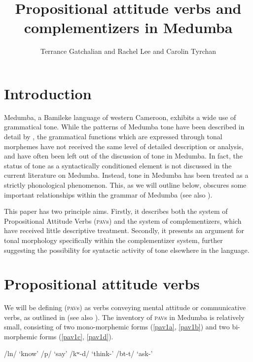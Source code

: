\documentclass[output=paper,colorlinks,citecolor=brown]{langscibook}
\author{Terrance Gatchalian\affiliation{University of British Columbia} and Rachel Lee\affiliation{University of British Columbia} and  Carolin Tyrchan\affiliation{University of Potsdam}}
\title{Propositional attitude verbs and complementizers in Medumba}
\begin{document}
\maketitle

\section{Introduction}

Medumba, a Bamileke language of western Cameroon, exhibits a wide use of grammatical tone. While the patterns of Medumba tone have been described in detail by \cite{Voorhoeve1971}, the grammatical functions which are expressed through tonal morphemes have not received the same level of detailed description or analysis, and have often been left out of the discussion of tone in Medumba. In fact, the status of tone as a syntactically conditioned element is not discussed in the current literature on Medumba. Instead, tone in Medumba has been treated as a strictly phonological phenomenon. This, as we will outline below, obscures some important relationships within the grammar of Medumba (see also \citealt{Keupdjio2020}).

This paper has two principle aims. Firstly, it describes both the system of Propositional Attitude Verbs (\textsc{pav}s) and the system of complementizers, which have received little descriptive treatment. Secondly, it presents an argument for tonal morphology specifically within the complementizer system, further suggesting the possibility for syntactic activity of tone elsewhere in the language.

\section{Propositional attitude verbs}

We will be defining  (\textsc{pav}s) as verbs conveying mental attitude or communicative verbs, as outlined in \citet{Pearson2021} (see also \citealt{Asher1987}). The inventory of \textsc{pav}s in Medumba is relatively small, consisting of two mono-morphemic forms (\ref{pav1a}, \ref{pav1b}) and two bi-morphemic forms (\ref{pav1c}, \ref{pav1d}).

\ea \label{PAV1}
    \begin{xlist}
    \ex /l\epL n/                   \tab `know'                  \label{pav1a}
    \ex /p/                   \tab `say'                   \label{pav1b}
    \ex /kʷ\epL-d\schwaL/   \tab `think-'      \label{pav1c}
    \ex /b\epH t-t\schwaH/          \tab `ask-'        \label{pav1d}
    \end{xlist}
\z
\end{document}
